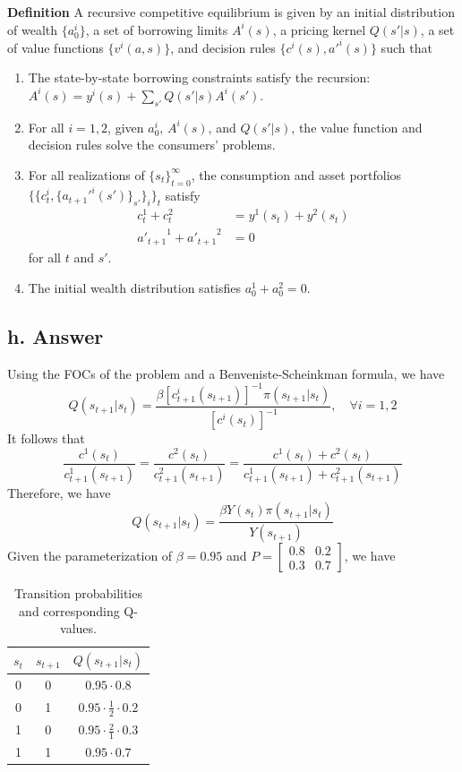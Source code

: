 \documentclass[11pt]{article}
\theoremstyle{definition}
\theoremstyle{boldtitle} %
\numberwithin{equation}{section}
\numberwithin{figure}{section}
\numberwithin{table}{section}
\begin{document}
\noindent \textbf{Definition}
A recursive competitive equilibrium is given by 
an initial distribution of wealth $\{a_0^i\}$, a set of borrowing limits 
$A^i(s)$, a pricing kernel $Q(s'|s)$, 
a set of value functions $\{v^i(a, s) \}$, and 
decision rules $\{c^i(s), {a'}^i(s) \}$ such that 
\begin{enumerate}
    \item The state-by-state borrowing constraints satisfy the recursion: $  A^i(s) = y^i(s) + \sum_{s'} Q(s'|s)  A^i(s')$.
    \item For all $i = 1, 2$, given $a^i_0$, $A^i(s)$, and $Q(s'|s)$, the value function and decision rules solve the consumers' problems.
    \item For all realizations of $\{s_t \}_{t=0}^\infty$, the consumption and asset portfolios $\{ \{c^i_t, \{{{a_{t+1}'}^i}(s')\}_{s'} \}_i\}_t$ 
    satisfy 
    \begin{align*}
        c^1_t + c^2_t & = y^1(s_t) + y^2(s_t) \\
        {a'_{t+1}}^1 + {a'_{t+1}}^2 & = 0
    \end{align*}
    for all $t$ and $s'$.
    \item The initial wealth distribution satisfies $a_0^1 + a_0^2 = 0$.
\end{enumerate}


\subsection{h. Answer} 
Using the FOCs of the problem and a Benveniste-Scheinkman formula, we have 
\[
Q(s_{t+1}|s_t) = \frac{\beta [c^i_{t+1}(s_{t+1})]^{-1} \pi(s_{t+1} | s_t)
    }{ [c^i(s_t)]^{-1}}, \quad \forall i = 1, 2
\]
It follows that 
\[
\frac{c^1(s_t)}{c^1_{t+1}(s_{t+1})} = \frac{c^2(s_t)}{c^2_{t+1}(s_{t+1})} = \frac{c^1(s_t) + c^2(s_t)}{c^1_{t+1}(s_{t+1}) + c^2_{t+1}(s_{t+1})}
\]
Therefore, we have 
\[
Q(s_{t+1}|s_t) = \frac{\beta Y(s_t) \pi(s_{t+1} | s_t)}{ Y(s_{t+1})}
\]
Given the parameterization of $\beta = 0.95$ and 
$P = \begin{bmatrix}
    0.8 & 0.2 \\ 0.3 & 0.7
\end{bmatrix} $, we have 

\begin{table}[h!]
\centering
\begin{tabular}{ccc}
\hline
$s_t$ & $s_{t+1}$ & $Q(s_{t+1} | s_t)$ \\ \hline
0     & 0         & $0.95 \cdot 0.8$ \\ 
0     & 1         & $0.95 \cdot \frac{1}{2} \cdot 0.2$ \\  
1     & 0         & $0.95 \cdot \frac{2}{1} \cdot 0.3$ \\  
1     & 1         & $0.95 \cdot 0.7$ \\ \hline
\end{tabular}
\caption{Transition probabilities and corresponding Q-values.}
\label{tab:q_values}
\end{table}
\end{document}

